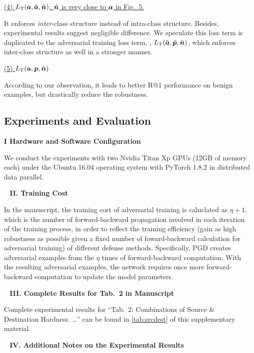 \ul{(4) $L_\text{T}({\bm{a}}, \tilde{{\bm{a}}}, \tilde{{\bm{n}}})$: $\tilde{{\bm{n}}}$ is very close to ${\bm{a}}$ in Fig.~5.}

It enforces \emph{inter}-class structure instead of intra-class structure.
%
Besides, experimental results suggest negligible difference.
%
We speculate this loss term is duplicated to the adversarial training loss term,
\ie, $L_\text{T}(\tilde{{\bm{a}}}, \tilde{{\bm{p}}}, \tilde{{\bm{n}}})$, which enforces
inter-class structure as well in a stronger manner.

\ul{(5) $L_\text{T}({\bm{a}}, {\bm{p}}, \tilde{{\bm{n}}})$}

According to our observation, it leads to better R@1 performance on benign
examples, but drastically reduce the robustness.

\subsection{Experiments and Evaluation}

\noindent\textbf{I Hardware and Software Configuration}

We conduct the experiments with two Nvidia Titan Xp GPUs (12GB of memory each)
under the Ubuntu 16.04 operating system with PyTorch 1.8.2 in distributed data
parallel.

~\newline
\noindent\textbf{II. Training Cost}

In the manuscript, the training cost of adversarial training is caluclated as
$\eta+1$, which is the number of forward-backward propagation involved in each
iteration of the training process, in order to reflect the training efficiency
(gain as high robustness as possible given a fixed number of foward-backward
calculation for adversarial training) of different defense methods.
%
Specifically, PGD creates adversarial examples from the $\eta$ times of
forward-backward computation.
%
With the resulting adversarial examples, the network requires once
more forward-backward computation to update the model parameters.

~\newline
\noindent\textbf{III. Complete Results for Tab.~2 in Manuscript}



Complete experimental results for ``Tab.~2: Combinations of Source \&
Destination Hardness. \ldots'' can be found in \cref{tab:srcdest} of this
supplementary material.

~\newline
\noindent\textbf{IV. Additional Notes on the Experimental Results}


